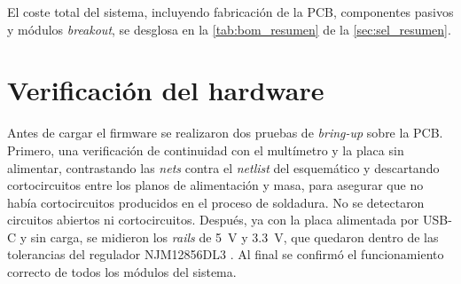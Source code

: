 El coste total del sistema, incluyendo fabricación de la PCB, componentes
pasivos y módulos \textit{breakout}, se desglosa en la \cref{tab:bom_resumen}
de la \cref{sec:sel_resumen}.

\section{Verificación del hardware}
\label{sec:verificacion}

Antes de cargar el firmware se realizaron dos pruebas de \textit{bring-up}
sobre la PCB. Primero, una verificación de continuidad con el multímetro y
la placa sin alimentar, contrastando las \textit{nets} contra el
\textit{netlist} del esquemático y descartando cortocircuitos entre los
planos de alimentación y masa, para asegurar que no había cortocircuitos producidos en el proceso de soldadura. No se detectaron circuitos abiertos ni cortocircuitos. Después, ya con la
placa alimentada por USB-C y sin carga, se midieron los \textit{rails} de
\SI{5}{\volt} y \SI{3.3}{\volt}, que quedaron dentro de las tolerancias del
regulador NJM12856DL3 \cite{ds_njm12856}. Al final se confirmó el funcionamiento correcto de todos los módulos del sistema.
